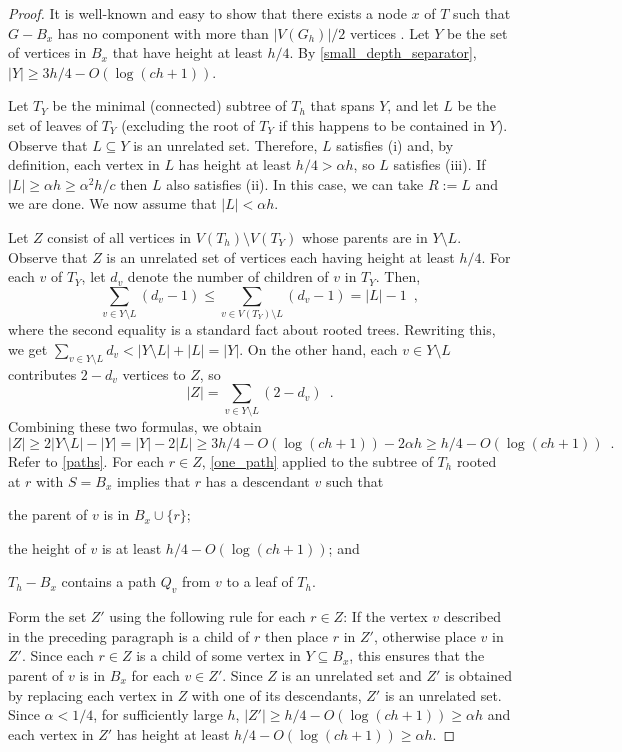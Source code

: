 \documentclass{patmorin}
\renewcommand{\le}{\leqslant}
\renewcommand{\ge}{\geqslant}
\begin{document}
\begin{proof}
  It is well-known and easy to show that there exists a node $x$ of $T$ such that $G-B_x$ has no component with more than $|V(G_h)|/2$ vertices \cite[(2.6)]{robertson.seymour:graph}. Let $Y$ be the set of vertices in $B_x$ that have height at least $h/4$.  By \cref{small_depth_separator}, $|Y|\ge 3h/4 - O(\log (ch+1))$.

  Let $T_Y$ be the minimal (connected) subtree of $T_h$ that spans $Y$, and let $L$ be the set of leaves of $T_Y$ (excluding the root of $T_Y$ if this happens to be contained in $Y$).  Observe that $L\subseteq Y$ is an unrelated set. Therefore, $L$ satisfies (i) and, by definition, each vertex in $L$ has height at least $h/4 > \alpha h$, so $L$ satisfies (iii).  If $|L|\ge \alpha h \ge \alpha^2 h/c$ then $L$ also satisfies (ii).  In this case, we can take $R:=L$ and we are done.  We now assume that $|L|< \alpha h$.

  Let $Z$ consist of all vertices in $V(T_h)\setminus V(T_Y)$ whose parents are in $Y\setminus L$.   Observe that $Z$ is an unrelated set of vertices each having height at least $h/4$. For each $v$ of $T_Y$, let $d_v$ denote the number of children of $v$ in $T_Y$.  Then,
  \[
     \sum_{v\in Y\setminus L} (d_v-1)
     \le \sum_{v\in V(T_Y)\setminus L} (d_v-1)
     = |L|-1 \enspace ,
  \]
  where the second equality is a standard fact about rooted trees.
  Rewriting this, we get $\sum_{v\in Y\setminus L} {d_v} < |Y\setminus L| + |L| = |Y|$.  On the other hand, each $v\in Y\setminus L$ contributes $2-d_v$ vertices to $Z$, so
  \[
    |Z| = \sum_{v\in Y\setminus L} (2-d_v) \enspace .
  \]
  Combining these two formulas, we obtain
  \[
    |Z| \ge 2|Y\setminus L| - |Y| = |Y| - 2|L|
    \ge 3h/4-O(\log(ch+1)) - 2\alpha h
    \ge h/4-O(\log(ch+1)) \enspace .
  \]
  Refer to \cref{paths}.  For each $r\in Z$, \cref{one_path} applied to the subtree of $T_h$ rooted at $r$ with $S=B_x$ implies that $r$ has a descendant $v$ such that
  \begin{inparaenum}[(a)]
    \item the parent of $v$ is in $B_x\cup\{r\}$;
    \item the height of $v$ is at least $h/4-O(\log(ch+1))$; and
    \item $T_h-B_x$ contains a path $Q_{v}$ from $v$ to a leaf of $T_h$.
  \end{inparaenum}

  Form the set $Z'$ using the following rule for each $r\in Z$: If the vertex $v$ described in the preceding paragraph is a child of $r$ then place $r$ in $Z'$, otherwise place $v$ in $Z'$. Since each $r\in Z$ is a child of some vertex in $Y\subseteq B_x$, this ensures that the parent of $v$ is in $B_x$ for each $v\in Z'$.  Since $Z$ is an unrelated set and $Z'$ is obtained by replacing each vertex in $Z$ with one of its descendants, $Z'$ is an unrelated set.  Since $\alpha < 1/4$, for sufficiently large $h$, $|Z'|\ge h/4 - O(\log(ch+1)) \ge \alpha h$ and each vertex in $Z'$ has height at least $h/4 - O(\log(ch+1)) \ge \alpha h$.


\end{proof}
\end{document}
